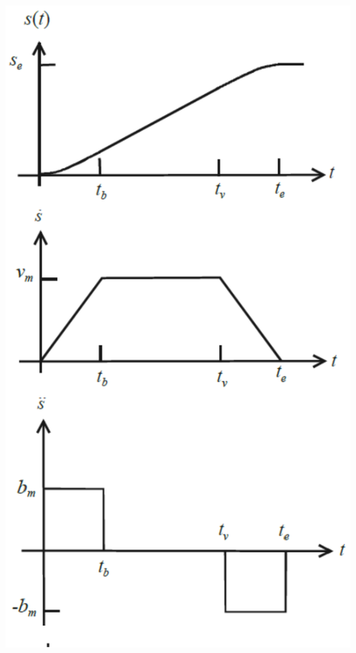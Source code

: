 \begin{minipage}{0.25\linewidth}
    \includegraphics[width=\linewidth]{./bilder/RampenTrapez}
\end{minipage}
